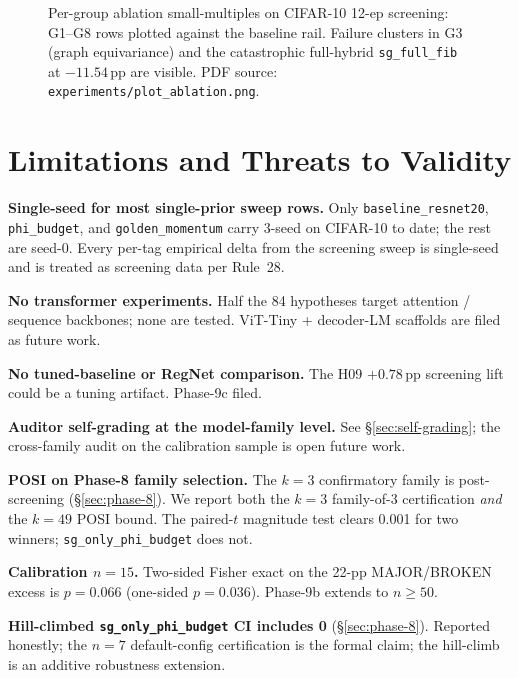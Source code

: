 \documentclass{article}
\begin{document}
\begin{figure}[t]
  \centering
  \caption{Per-group ablation small-multiples on CIFAR-10 12-ep
  screening: G1--G8 rows plotted against the baseline rail.
  Failure clusters in G3 (graph equivariance) and the catastrophic
  full-hybrid \texttt{sg\_full\_fib} at $-11.54$\,pp are visible.
  PDF source: \texttt{experiments/plot\_ablation.png}.}
  \label{fig:ablation}
\end{figure}

\section{Limitations and Threats to Validity}
\label{sec:limitations}

\textbf{Single-seed for most single-prior sweep rows.} Only
\texttt{baseline\_resnet20}, \texttt{phi\_budget}, and
\texttt{golden\_momentum} carry 3-seed on CIFAR-10 to date; the rest
are seed-0. Every per-tag empirical delta from the screening sweep is
single-seed and is treated as screening data per Rule~28.

\textbf{No transformer experiments.} Half the 84 hypotheses target
attention / sequence backbones; none are tested. ViT-Tiny + decoder-LM
scaffolds are filed as future work.

\textbf{No tuned-baseline or RegNet comparison.} The H09
$+0.78$\,pp screening lift could be a tuning artifact. Phase-9c filed.

\textbf{Auditor self-grading at the model-family level.} See
\S\ref{sec:self-grading}; the cross-family audit on the calibration
sample is open future work.

\textbf{POSI on Phase-8 family selection.} The $k{=}3$ confirmatory
family is post-screening (\S\ref{sec:phase-8}). We report both the
$k{=}3$ family-of-3 certification \emph{and} the $k{=}49$ POSI bound.
The paired-$t$ magnitude test clears 0.001 for two winners;
\texttt{sg\_only\_phi\_budget} does not.

\textbf{Calibration $n{=}15$.} Two-sided Fisher exact on the 22-pp
MAJOR/BROKEN excess is $p=0.066$ (one-sided $p=0.036$). Phase-9b
extends to $n\geq 50$.

\textbf{Hill-climbed \texttt{sg\_only\_phi\_budget} CI includes 0}
(\S\ref{sec:phase-8}). Reported honestly; the $n{=}7$ default-config
certification is the formal claim; the hill-climb is an additive
robustness extension.
\end{document}
